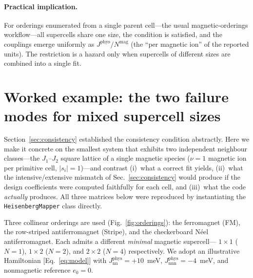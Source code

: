 \documentclass[11pt]{article}
\newcommand{\code}[1]{\texttt{\def\_{\textunderscore\allowbreak}#1}}
\begin{document}
\paragraph{Practical implication.} For orderings enumerated from a single parent
cell---the usual magnetic-orderings workflow---all supercells share one size, the
condition is satisfied, and the couplings emerge uniformly as
$J^{\mathrm{phys}}/N^{\mathrm{mag}}$ (the ``per magnetic ion'' of the reported
units). The restriction is a hazard only when supercells of different sizes are
combined into a single fit.

\section{Worked example: the two failure modes for mixed supercell sizes}
\label{sec:example}

Section~\ref{sec:consistency} established the consistency condition abstractly.
Here we make it concrete on the smallest system that exhibits two independent
neighbour classes---the $J_1$--$J_2$ square lattice of a single magnetic species
($\nu=1$ magnetic ion per primitive cell, $|s_i|=1$)---and contrast (i)~what a
correct fit yields, (ii)~what the intensive/extensive mismatch of
Sec.~\ref{sec:consistency} would produce if the design coefficients were computed
faithfully for each cell, and (iii)~what the code \emph{actually} produces. All
three matrices below were reproduced by instantiating the \code{HeisenbergMapper}
class directly.

Three collinear orderings are used (Fig.~\ref{fig:orderings}): the ferromagnet
(FM), the row-striped antiferromagnet (Stripe), and the checkerboard N\'eel
antiferromagnet. Each admits a different \emph{minimal} magnetic supercell---%
$1\times1$ ($N=1$), $1\times2$ ($N=2$), and $2\times2$ ($N=4$) respectively. We
adopt an illustrative Hamiltonian [Eq.~\eqref{eq:model}] with
$J_{\mathrm{nn}}^{\mathrm{phys}}=+10$~meV, $J_{\mathrm{nnn}}^{\mathrm{phys}}=-4$~meV,
and nonmagnetic reference $e_0=0$.
\end{document}
